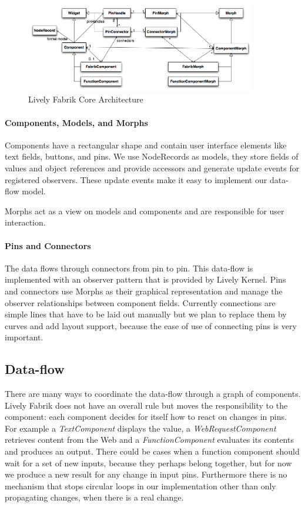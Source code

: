 \documentclass[pdftex, times, 10pt, twocolumn]{article}
\begin{document}
\begin{figure}[]\centering
\includegraphics[width=0.900000\textwidth]{LivelyFabrikCore.png} 

\caption{Lively Fabrik Core Architecture }
\label{fig:LivelyFabrikCore}
\end{figure}


\paragraph{Components, Models, and Morphs}
Components have a rectangular shape and contain user interface elements like text fields, buttons, and pins.  We use NodeRecords as models, they store fields of values and object references and provide accessors and generate update events for registered observers. These update events make it easy to implement our data-flow model.  

Morphs act as a view on models and components and are responsible for user interaction.  



\paragraph{Pins and Connectors}
The data flows through connectors from pin to pin. This data-flow is implemented with an observer pattern that is provided by Lively Kernel. Pins and connectors use Morphs as their graphical representation and manage the observer relationships between component fields. Currently connections are simple lines that have to be laid out manually but we plan to replace them by curves and add layout support, because the ease of use of connecting pins is very important. 



\subsection{Data-flow}
There are many ways to coordinate the data-flow through a graph of components. Lively Fabrik does not have an overall rule but moves the responsibility to the component: each component decides for itself how to react on changes in pins. For example a {\em TextComponent} displays the value, a {\em WebRequestComponent} retrieves content from the Web and a {\em FunctionComponent} evaluates its contents and produces an output. There could be cases when a function component should wait for a set of new inputs, because they perhaps belong together, but for now we produce a new result for any change in input pins. Furthermore there is no mechanism that stops circular loops in our implementation other than only propagating changes, when there is a real change.  
\end{document}

